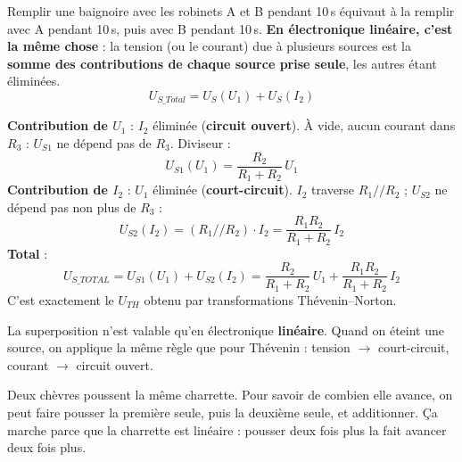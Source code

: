 
\begin{thmbox}[title=Théorème de superposition]
Remplir une baignoire avec les robinets A et B pendant 10\,s équivaut à la remplir avec A
pendant 10\,s, puis avec B pendant 10\,s. \textbf{En électronique linéaire, c'est la même
chose} : la tension (ou le courant) due à plusieurs sources est la \textbf{somme des
contributions de chaque source prise seule}, les autres étant éliminées.
\[ U_{S\_Total} = U_S(U_1) + U_S(I_2) \]
\end{thmbox}


\begin{exbox}[title={Superposition sur le montage 2 ($U_1$, $I_2$, sortie à vide)}]
\textbf{Contribution de $U_1$} : $I_2$ éliminée (\textbf{circuit ouvert}). À vide, aucun
courant dans $R_3$ : $U_{S1}$ ne dépend pas de $R_3$. Diviseur :
\[ U_{S1}(U_1) = \frac{R_2}{R_1 + R_2}\,U_1 \]
\textbf{Contribution de $I_2$} : $U_1$ éliminée (\textbf{court-circuit}). $I_2$ traverse
$R_1/\!/R_2$ ; $U_{S2}$ ne dépend pas non plus de $R_3$ :
\[ U_{S2}(I_2) = (R_1/\!/R_2)\cdot I_2 = \frac{R_1R_2}{R_1 + R_2}\,I_2 \]
\textbf{Total} :
\[ U_{S\_TOTAL} = U_{S1}(U_1) + U_{S2}(I_2)
   = \frac{R_2}{R_1 + R_2}\,U_1 + \frac{R_1 R_2}{R_1 + R_2}\,I_2 \]
C'est exactement le $U_{TH}$ obtenu par transformations Thévenin--Norton.
\end{exbox}

\begin{warnbox}[title=Conditions]
La superposition n'est valable qu'en électronique \textbf{linéaire}. Quand on éteint une
source, on applique la même règle que pour Thévenin : tension $\to$ court-circuit, courant
$\to$ circuit ouvert.
\end{warnbox}

\begin{goatbox}
Deux chèvres poussent la même charrette. Pour savoir de combien elle avance, on peut faire
pousser la première seule, puis la deuxième seule, et additionner. Ça marche parce que la
charrette est \og linéaire\fg{} : pousser deux fois plus la fait avancer deux fois plus.
\end{goatbox}

